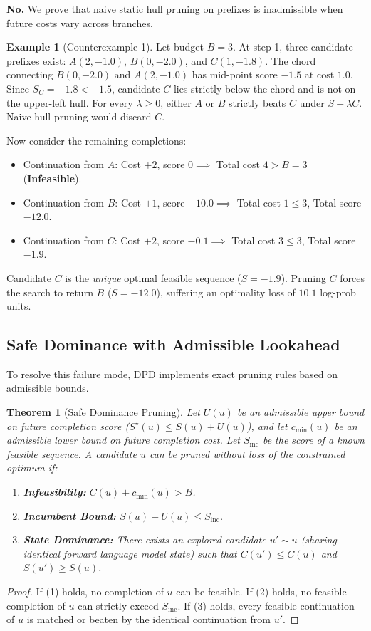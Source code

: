 \documentclass[11pt,a4paper]{article}
\theoremstyle{plain}
\newtheorem{theorem}{Theorem}
\theoremstyle{definition}
\newtheorem{example}{Example}
\theoremstyle{remark}
\begin{document}
\textbf{No.} We prove that naive static hull pruning on prefixes is inadmissible when future costs vary across branches.
\begin{example}[Counterexample 1]
Let budget $B = 3$. At step 1, three candidate prefixes exist: $A(2, -1.0)$, $B(0, -2.0)$, and $C(1, -1.8)$. The chord connecting $B(0, -2.0)$ and $A(2, -1.0)$ has mid-point score $-1.5$ at cost $1.0$. Since $S_C = -1.8 < -1.5$, candidate $C$ lies strictly below the chord and is not on the upper-left hull. For every $\lambda \ge 0$, either $A$ or $B$ strictly beats $C$ under $S - \lambda C$. Naive hull pruning would discard $C$.

Now consider the remaining completions:
\begin{itemize}
    \item Continuation from $A$: Cost $+2$, score $0 \implies$ Total cost $4 > B=3$ (\textbf{Infeasible}).
    \item Continuation from $B$: Cost $+1$, score $-10.0 \implies$ Total cost $1 \le 3$, Total score $-12.0$.
    \item Continuation from $C$: Cost $+2$, score $-0.1 \implies$ Total cost $3 \le 3$, Total score $-1.9$.
\end{itemize}
Candidate $C$ is the \emph{unique} optimal feasible sequence ($S = -1.9$). Pruning $C$ forces the search to return $B$ ($S = -12.0$), suffering an optimality loss of $10.1$ log-prob units.
\end{example}

\subsection{Safe Dominance with Admissible Lookahead}
To resolve this failure mode, DPD implements exact pruning rules based on admissible bounds.

\begin{theorem}[Safe Dominance Pruning]
\label{thm:safe_dominance}
Let $U(u)$ be an admissible upper bound on future completion score ($S^\star(u) \le S(u) + U(u)$), and let $c_{\min}(u)$ be an admissible lower bound on future completion cost. Let $S_{\text{inc}}$ be the score of a known feasible sequence. A candidate $u$ can be pruned without loss of the constrained optimum if:
\begin{enumerate}
    \item \textbf{Infeasibility:} $C(u) + c_{\min}(u) > B$.
    \item \textbf{Incumbent Bound:} $S(u) + U(u) \le S_{\text{inc}}$.
    \item \textbf{State Dominance:} There exists an explored candidate $u' \sim u$ (sharing identical forward language model state) such that $C(u') \le C(u)$ and $S(u') \ge S(u)$.
\end{enumerate}
\end{theorem}
\begin{proof}
If (1) holds, no completion of $u$ can be feasible. If (2) holds, no feasible completion of $u$ can strictly exceed $S_{\text{inc}}$. If (3) holds, every feasible continuation of $u$ is matched or beaten by the identical continuation from $u'$.
\end{proof}
\end{document}
